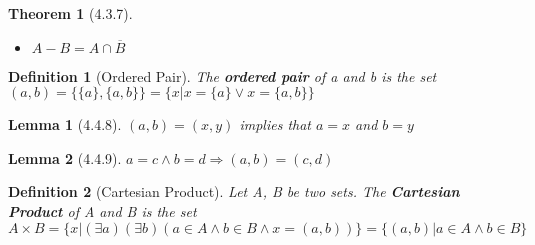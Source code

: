\documentclass[12pt, letterpaper]{article}
\theoremstyle{plain}
\newtheorem*{theorem*}{Theorem}
\newtheorem*{lemma*}{Lemma}
\newtheorem*{definition*}{Definition}
\begin{document}
\begin{mdframed}[leftmargin=0.01cm, rightmargin=0.01cm]
\begin{theorem*}[4.3.7]
\begin{itemize}
                \item[(v)] $A - B = A\cap \overline{B}$
            \end{itemize}
        \end{theorem*}
        \begin{definition*}[Ordered Pair]
            The \textbf{ordered pair} of a and b is the set \\$(a, b) = \{\{a\},\{a,b\}\} = \{x | x = \{a\} \vee x = \{a, b\}\}$
        \end{definition*}
        \begin{lemma*}[4.4.8]
            $(a, b) = (x, y)$ implies that $a = x$ and $b = y$
        \end{lemma*}
        \begin{lemma*}[4.4.9]
            $a = c \wedge b = d \Rightarrow (a,b) = (c,d)$
        \end{lemma*}
        \begin{definition*}[Cartesian Product]
            Let A, B be two sets. The \textbf{Cartesian Product} of A and B is the set $A \times B = \{x | (\exists a)(\exists b)(a \in A \wedge b \in B \wedge x = (a,b))\} = \{(a,b) | a \in A \wedge b \in B\}$
        \end{definition*}
    \end{mdframed}
    \newpage
\end{document}
